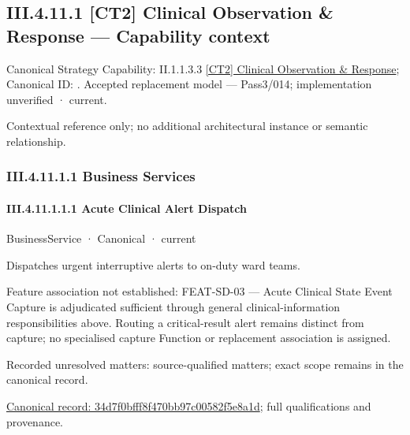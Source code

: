 \subsection*{III.4.11.1 [CT2] Clinical Observation \& Response — Capability context}
\label{navigation:III.4.11.1}

{\small Canonical Strategy Capability: II.1.1.3.3 \hyperref[element:b6794d4b6ac84b9d82613c41ad4650a2]{[CT2] Clinical Observation \& Response}; Canonical ID: \texttt{}. Accepted replacement model — Pass3/014; implementation unverified · current.}\par
Contextual reference only; no additional architectural instance or semantic relationship.\par
\subsubsection*{III.4.11.1.1 Business Services}
\label{navigation:III.4.11.1.1}

\paragraph*{III.4.11.1.1.1 Acute Clinical Alert Dispatch}
\label{navigation:III.4.11.1.1.1}

\label{element:34d7f0bfff8f470bb97c00582f5e8a1d}
{\small BusinessService · Canonical · current}\par

Dispatches urgent interruptive alerts to on-duty ward teams.



Feature association not established: FEAT-SD-03 — Acute Clinical State Event Capture is adjudicated sufficient through general clinical-information responsibilities above. Routing a critical-result alert remains distinct from capture; no specialised capture Function or replacement association is assigned.


{\small Recorded unresolved matters: source-qualified matters; exact scope remains in the canonical record.}\par
{\footnotesize \href{../../../../../../../../continuum/business/business-service/34d7f0bfff8f470bb97c00582f5e8a1d.md}{Canonical record: 34d7f0bfff8f470bb97c00582f5e8a1d}; full qualifications and provenance.}\par
